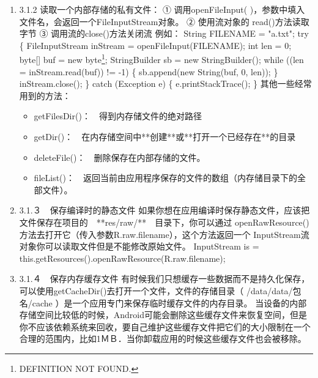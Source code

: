 \documentclass[9pt, b5paper]{article}
\begin{document}
\begin{enumerate}
\begin{itemize}
\item mode参数：用于指定操作模式，分为四种：
\item Context.MODE\_PRIVATE = 0
\end{itemize}
为默认操作模式，代表该文件是私有数据，只能被应用本身访问，在该模式下，写入的内容会覆盖原文件的内容。
\begin{itemize}
\item Context.MODE\_APPEND = 32768
\end{itemize}
该模式会检查文件是否存在，存在就往文件追加内容，否则就创建新文件。　
\begin{itemize}
\item Context.MODE\_WORLD\_READABLE = 1
\end{itemize}
表示当前文件可以被其他应用读取。
\begin{itemize}
\item MODE\_WORLD\_WRITEABLE
\end{itemize}
表示当前文件可以被其他应用写入。
\item 3.1.2 读取一个内部存储的私有文件：
\label{sec-7-0-3-3}
① 调用openFileInput( )，参数中填入文件名，会返回一个FileInputStream对象。
② 使用流对象的 read()方法读取字节
③ 调用流的close()方法关闭流
例如：
    String FILENAME = "a.txt";
        try \{
            FileInputStream inStream = openFileInput(FILENAME);
            int len = 0;
            byte[] buf = new byte\footnote{DEFINITION NOT FOUND.};
            StringBuilder sb = new StringBuilder();
            while ((len = inStream.read(buf)) != -1) \{
                sb.append(new String(buf, 0, len));
            \}
            inStream.close();
        \} catch (Exception e) \{
            e.printStackTrace();
        \} 
其他一些经常用到的方法：
\begin{itemize}
\item getFilesDir()：　得到内存储文件的绝对路径
\item getDir()：　在内存储空间中**创建**或**打开一个已经存在**的目录
\item deleteFile()：　删除保存在内部存储的文件。　　
\item fileList()：　返回当前由应用程序保存的文件的数组（内存储目录下的全部文件）。　
\end{itemize}

\item 3.1.３　保存编译时的静态文件
\label{sec-7-0-3-4}
如果你想在应用编译时保存静态文件，应该把文件保存在项目的　**res/raw/**　目录下，你可以通过 openRawResource()方法去打开它（传入参数R.raw.filename），这个方法返回一个 InputStream流对象你可以读取文件但是不能修改原始文件。
InputStream is = this.getResources().openRawResource(R.raw.filename);
\item 3.1.４　保存内存缓存文件
\label{sec-7-0-3-5}
有时候我们只想缓存一些数据而不是持久化保存，可以使用getCacheDir()去打开一个文件，文件的存储目录（ /data/data/包名/cache ）是一个应用专门来保存临时缓存文件的内存目录。
当设备的内部存储空间比较低的时候，Android可能会删除这些缓存文件来恢复空间，但是你不应该依赖系统来回收，要自己维护这些缓存文件把它们的大小限制在一个合理的范围内，比如1ＭＢ．当你卸载应用的时候这些缓存文件也会被移除。
\end{enumerate}
\end{document}
